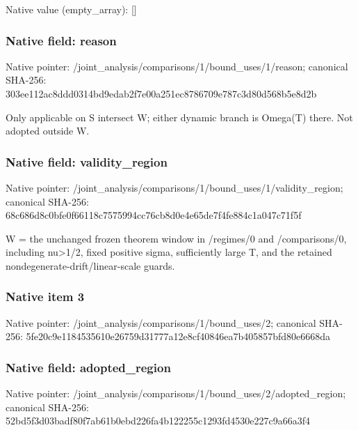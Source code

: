 \documentclass[10pt,a4paper]{article}
\begin{document}
Native value (empty\_\allowbreak{}array): []

\subsubsection{Native field: reason}
Native pointer: /joint\_\allowbreak{}analysis/comparisons/1/bound\_\allowbreak{}uses/1/reason; canonical SHA-256: 303ee112ac8ddd0314bd9edab2f7e00a251ec8786709e787c3d80d568b5e8d2b

\begingroup\raggedright\sloppy Only applicable on S intersect W;\allowbreak{} either dynamic branch is Omega(T) there. Not adopted outside W.\par\endgroup

\subsubsection{Native field: validity\_\allowbreak{}region}
Native pointer: /joint\_\allowbreak{}analysis/comparisons/1/bound\_\allowbreak{}uses/1/validity\_\allowbreak{}region; canonical SHA-256: 68c686d8c0bfe0f66118c7575994cc76cb8d0e4e65de7f4fe884c1a047c71f5f

\begingroup\raggedright\sloppy W =\allowbreak{} the unchanged frozen theorem window in /\allowbreak{}regimes/\allowbreak{}0 and /\allowbreak{}comparisons/\allowbreak{}0,\allowbreak{} including nu>1/\allowbreak{}2,\allowbreak{} fixed positive sigma,\allowbreak{} sufficiently large T,\allowbreak{} and the retained nondegenerate-drift/\allowbreak{}linear-scale guards.\par\endgroup

\subsubsection{Native item 3}
Native pointer: /joint\_\allowbreak{}analysis/comparisons/1/bound\_\allowbreak{}uses/2; canonical SHA-256: 5fe20c9e1184535610e26759d31777a12e8cf40846ea7b405857bfd80e6668da

\subsubsection{Native field: adopted\_\allowbreak{}region}
Native pointer: /joint\_\allowbreak{}analysis/comparisons/1/bound\_\allowbreak{}uses/2/adopted\_\allowbreak{}region; canonical SHA-256: 52bd5f3d03badf80f7ab61b0ebd226fa4b122255c1293fd4530e227c9a66a3f4
\end{document}
